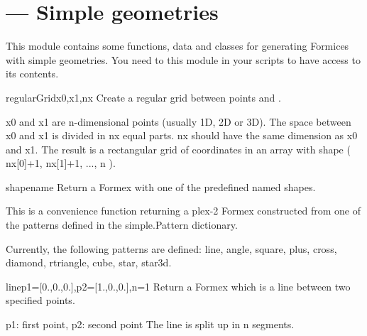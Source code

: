 

\section{ --- Simple geometries}
\label{sec:simple}



This module contains some functions, data and classes for generating Formices with simple geometries. You need to  this module in your scripts to have access to its contents.


\begin{funcdesc}{regularGrid}{x0,x1,nx}
  Create a regular grid between points  and .

  x0 and x1 are n-dimensional points (usually 1D, 2D or 3D).
  The space between x0 and x1 is divided in nx equal parts. nx should have
  the same dimension as x0 and x1.
  The result is a rectangular grid of coordinates in an array with
  shape ( nx[0]+1, nx[1]+1, ..., n ).
\end{funcdesc}


\begin{funcdesc}{shape}{name}
  Return a Formex with one of the predefined named shapes.

  This is a convenience function returning a plex-2 Formex constructed
  from one of the patterns defined in the simple.Pattern dictionary.

  Currently, the following patterns are defined: line, angle, square, plus,
  cross, diamond, rtriangle, cube, star, star3d.
\end{funcdesc}
  

\begin{funcdesc}{line}{p1=[0.,0.,0.],p2=[1.,0.,0.],n=1}
  Return a Formex which is a line between two specified points.
    
  p1: first point, p2: second point
  The line is split up in n segments.
\end{funcdesc}


